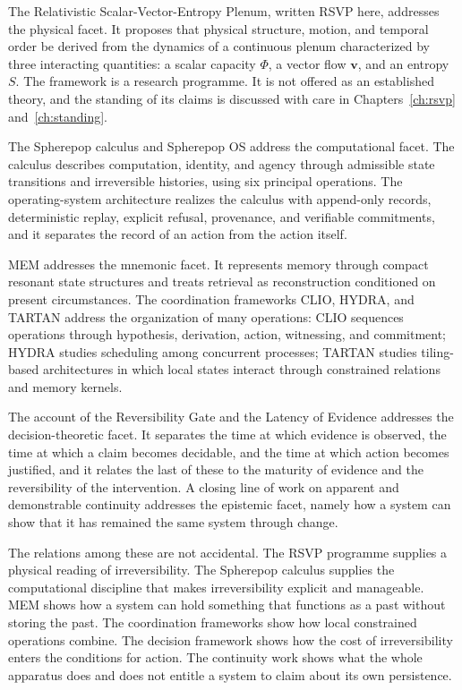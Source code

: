 \documentclass[11pt,twoside,openright]{book}
\theoremstyle{plain}
\theoremstyle{definition}
\theoremstyle{remark}
\newcommand{\memeight}{\mbox{MEM\textbar 8}}
\newcommand{\rsvp}{RSVP}
\begin{document}
The Relativistic Scalar-Vector-Entropy Plenum, written \rsvp{} here, addresses the physical facet. It proposes that physical structure, motion, and temporal order be derived from the dynamics of a continuous plenum characterized by three interacting quantities: a scalar capacity $\Phi$, a vector flow $\mathbf{v}$, and an entropy $S$. The framework is a research programme. It is not offered as an established theory, and the standing of its claims is discussed with care in Chapters~\ref{ch:rsvp} and~\ref{ch:standing}.

The Spherepop calculus and Spherepop OS address the computational facet. The calculus describes computation, identity, and agency through admissible state transitions and irreversible histories, using six principal operations. The operating-system architecture realizes the calculus with append-only records, deterministic replay, explicit refusal, provenance, and verifiable commitments, and it separates the record of an action from the action itself.

\memeight{} addresses the mnemonic facet. It represents memory through compact resonant state structures and treats retrieval as reconstruction conditioned on present circumstances. The coordination frameworks CLIO, HYDRA, and TARTAN address the organization of many operations: CLIO sequences operations through hypothesis, derivation, action, witnessing, and commitment; HYDRA studies scheduling among concurrent processes; TARTAN studies tiling-based architectures in which local states interact through constrained relations and memory kernels.

The account of the Reversibility Gate and the Latency of Evidence addresses the decision-theoretic facet. It separates the time at which evidence is observed, the time at which a claim becomes decidable, and the time at which action becomes justified, and it relates the last of these to the maturity of evidence and the reversibility of the intervention. A closing line of work on apparent and demonstrable continuity addresses the epistemic facet, namely how a system can show that it has remained the same system through change.

The relations among these are not accidental. The \rsvp{} programme supplies a physical reading of irreversibility. The Spherepop calculus supplies the computational discipline that makes irreversibility explicit and manageable. \memeight{} shows how a system can hold something that functions as a past without storing the past. The coordination frameworks show how local constrained operations combine. The decision framework shows how the cost of irreversibility enters the conditions for action. The continuity work shows what the whole apparatus does and does not entitle a system to claim about its own persistence.
\end{document}
